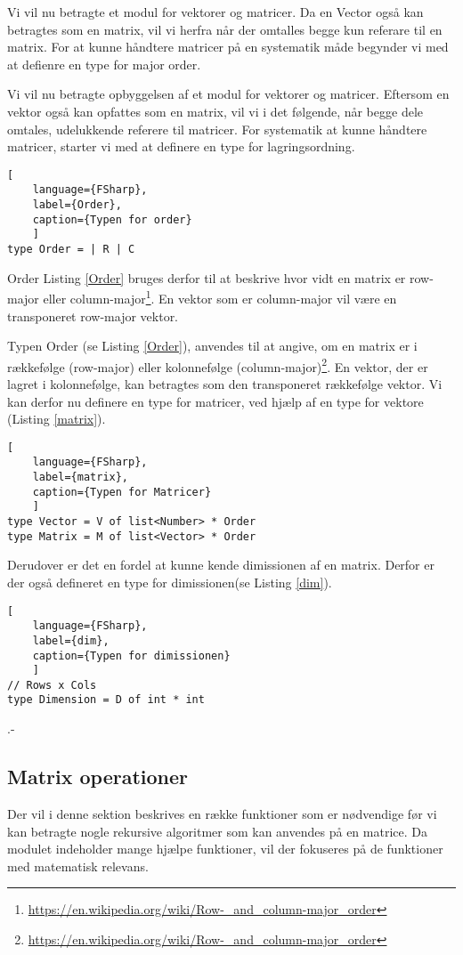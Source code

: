 Vi vil nu betragte et modul for vektorer og matricer. Da en Vector også kan betragtes som en matrix, vil vi herfra når der omtalles begge kun referare til en matrix. For at kunne håndtere matricer på en systematik måde begynder vi med at defienre en type for major order.

Vi vil nu betragte opbyggelsen af et modul for vektorer og matricer. Eftersom en vektor også kan opfattes som en matrix, vil vi i det følgende, når begge dele omtales, udelukkende referere til matricer. For systematik at kunne håndtere matricer, starter vi med at definere en type for lagringsordning.

\begin{lstlisting}[
    language={FSharp}, 
    label={Order}, 
    caption={Typen for order}
    ]
type Order = | R | C
\end{lstlisting}

Order Listing \ref{Order} bruges derfor til at beskrive hvor vidt en matrix er row-major eller column-major\footnote{\url{https://en.wikipedia.org/wiki/Row-_and_column-major_order}}. En vektor som er column-major vil være en transponeret row-major vektor.  

Typen Order (se Listing \ref{Order}), anvendes til at angive, om en matrix er i rækkefølge (row-major) eller kolonnefølge (column-major)\footnote{\url{https://en.wikipedia.org/wiki/Row-_and_column-major_order}}. En vektor, der er lagret i kolonnefølge, kan betragtes som den transponeret rækkefølge vektor. Vi kan derfor nu definere en type for matricer, ved hjælp af en type for vektore (Listing \ref{matrix}).

\begin{lstlisting}[
    language={FSharp}, 
    label={matrix}, 
    caption={Typen for Matricer}
    ]
type Vector = V of list<Number> * Order
type Matrix = M of list<Vector> * Order
\end{lstlisting}

Derudover er det en fordel at kunne kende dimissionen af en matrix. Derfor er der også defineret en type for dimissionen(se Listing \ref{dim}).

\begin{lstlisting}[
    language={FSharp}, 
    label={dim}, 
    caption={Typen for dimissionen}
    ]
// Rows x Cols
type Dimension = D of int * int
\end{lstlisting}



.-\subsection{Matrix operationer}
Der vil i denne sektion beskrives en række funktioner som er nødvendige før vi kan betragte nogle rekursive algoritmer som kan anvendes på en matrice. Da modulet indeholder mange hjælpe funktioner, vil der fokuseres på de funktioner med matematisk relevans.

